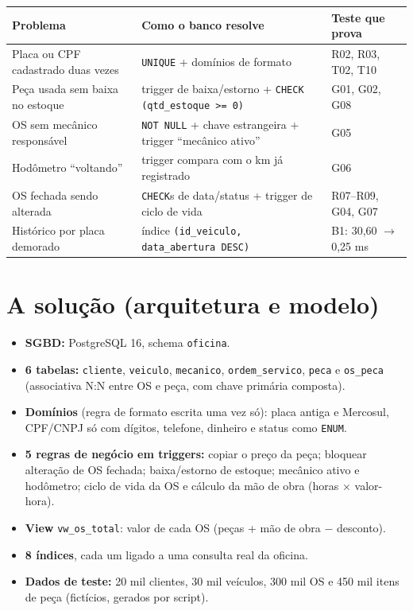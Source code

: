 \documentclass[a4paper,11pt]{article}
\newcommand{\cod}[1]{\texttt{\small #1}}
\begin{document}
\begin{longtable}{p{4.6cm}p{6.2cm}p{4.2cm}}
\hline
\textbf{Problema} & \textbf{Como o banco resolve} & \textbf{Teste que prova} \\ \hline
Placa ou CPF cadastrado duas vezes & \cod{UNIQUE} + domínios de formato & R02, R03, T02, T10 \\
Peça usada sem baixa no estoque & trigger de baixa/estorno + \cod{CHECK (qtd\_estoque >= 0)} & G01, G02, G08 \\
OS sem mecânico responsável & \cod{NOT NULL} + chave estrangeira + trigger ``mecânico ativo'' & G05 \\
Hodômetro ``voltando'' & trigger compara com o km já registrado & G06 \\
OS fechada sendo alterada & \cod{CHECK}s de data/status + trigger de ciclo de vida & R07--R09, G04, G07 \\
Histórico por placa demorado & índice \cod{(id\_veiculo, data\_abertura DESC)} & B1: 30,60 $\rightarrow$ 0,25 ms \\ \hline
\end{longtable}

\section{A solução (arquitetura e modelo)}
\begin{itemize}
  \item \textbf{SGBD:} PostgreSQL 16, schema \cod{oficina}.
  \item \textbf{6 tabelas:} \cod{cliente}, \cod{veiculo}, \cod{mecanico},
  \cod{ordem\_servico}, \cod{peca} e \cod{os\_peca} (associativa N:N entre OS e peça,
  com chave primária composta).
  \item \textbf{Domínios} (regra de formato escrita uma vez só): placa antiga e
  Mercosul, CPF/CNPJ só com dígitos, telefone, dinheiro e status como \cod{ENUM}.
  \item \textbf{5 regras de negócio em triggers:} copiar o preço da peça; bloquear
  alteração de OS fechada; baixa/estorno de estoque; mecânico ativo e hodômetro;
  ciclo de vida da OS e cálculo da mão de obra (horas $\times$ valor-hora).
  \item \textbf{View} \cod{vw\_os\_total}: valor de cada OS (peças + mão de obra $-$ desconto).
  \item \textbf{8 índices}, cada um ligado a uma consulta real da oficina.
  \item \textbf{Dados de teste:} 20 mil clientes, 30 mil veículos, 300 mil OS e
  450 mil itens de peça (fictícios, gerados por script).
\end{itemize}
\end{document}
